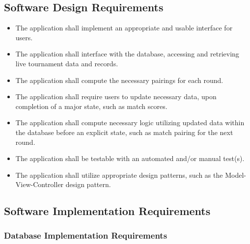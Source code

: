 \documentclass[11pt]{article}
\begin{document}
    \subsection{Software Design Requirements}
    \begin{itemize}
        \item The application shall implement an appropriate and usable interface for users.
        \item The application shall interface with the database, accessing and retrieving live tournament data and records.
        \item The application shall compute the necessary pairings for each round.
        \item The application shall require users to update necessary data, upon completion of a major state, such as match scores.
        \item The application shall compute necessary logic utilizing updated data within the database before an explicit state, such as match pairing for the next round.
        \item The application shall be testable with an automated and/or manual test(s).
        \item The application shall utilize appropriate design patterns, such as the Model-View-Controller design pattern.
    \end{itemize}
    
    \newpage
    
    \subsection{Software Implementation Requirements}
    \subsubsection{Database Implementation Requirements}
    
\end{document}
